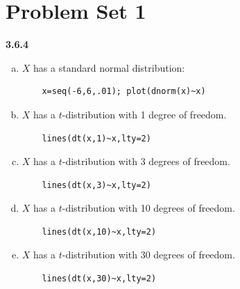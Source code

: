 \documentclass{book}
\theoremstyle{definition}
\begin{document}
\newpage

\section{Problem Set 1}

\noindent \textbf{3.6.4}
\begin{enumerate}[(a)]
	\item $X$ has a standard normal distribution:
	\begin{lstlisting}
	x=seq(-6,6,.01); plot(dnorm(x)~x)
	\end{lstlisting}
	\item $X$ has a $t$-distribution with 1 degree of freedom.
	\begin{lstlisting}
	lines(dt(x,1)~x,lty=2)
	\end{lstlisting}
	\item $X$ has a $t$-distribution with 3 degrees of freedom.
	\begin{lstlisting}
	lines(dt(x,3)~x,lty=2)
	\end{lstlisting}
	\item $X$ has a $t$-distribution with 10 degrees of freedom.
	\begin{lstlisting}
	lines(dt(x,10)~x,lty=2)
	\end{lstlisting}
	\item $X$ has a $t$-distribution with 30 degrees of freedom.
	\begin{lstlisting}
	lines(dt(x,30)~x,lty=2)
	\end{lstlisting}
\end{enumerate}
\end{document}
